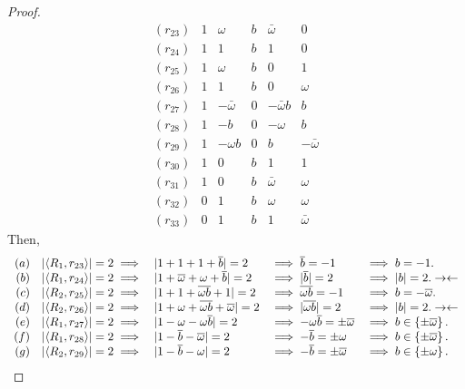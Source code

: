 \begin{lemma}
\begin{proof}
     $$
     \begin{array}{rccccc}
       (r_{23})  & 1 & \omega        & b         & \bar{\omega}   & 0 \\
       (r_{24})  & 1 & 1         & b         & 1         & 0 \\
       (r_{25})  & 1 & \omega        & b         & 0         & 1 \\
       (r_{26})  & 1 & 1         & b         & 0         & \omega  \\
       (r_{27})  & 1 & -\bar{\omega}  & 0         & -\bar{\omega}b & b \\
       (r_{28})  & 1 & -b        & 0         & -\omega        & b \\
       (r_{29})  & 1 & -\omega b       & 0         & b         & -\bar{\omega} \\
       (r_{30})  & 1 & 0         & b         & 1         & 1 \\
       (r_{31})  & 1 & 0         & b         & \bar{\omega}   & \omega  \\
       (r_{32})  & 0 & 1         & b         & \omega        & \omega  \\
       (r_{33})  & 0 & 1         & b         & 1         & \bar{\omega}
     \end{array}
     $$
Then,
     $$
     \begin{array}{rcllll}
      (a) & \unb1{23} \implies & |1+1+1+\bar{b}|=2             &\implies \bar{b}=-1             &\implies b = -1.          \\
      (b) & \unb1{24} \implies & |1+\bar{\omega}+\omega+\bar{b}|=2       &\implies |\bar{b}|=2            &\implies |b| = 2.   \con \\
      (c) & \unb2{25} \implies & |1+1+\overline{\omega b}+1|=2       &\implies \overline{\omega b} = -1     &\implies b = -\bar{\omega}.    \\
      (d) & \unb2{26} \implies & |1+\omega+\overline{\omega b}+\bar{\omega}|=2 &\implies |\overline{\omega b}|=2      &\implies |b| = 2.   \con \\
      (e) & \unb1{27} \implies & |1-\omega-\omega\bar{b}|=2              &\implies -\omega\bar{b} = \pm\bar{\omega} &\implies b \in \left\{ \pm\bar{\omega}\right\}.   \\
      (f) & \unb1{28} \implies & |1-\bar{b}-\bar{\omega}|=2         &\implies -\bar{b}=\pm\omega         &\implies b \in \left\{ \pm\bar{\omega}\right\}.  \\
      (g) & \unb2{29} \implies & |1-\bar{b}-\omega|=2               &\implies -\bar{b}=\pm\bar{\omega}    &\implies b \in \left\{ \pm\omega\right\}.       \\

\end{array}$$
\end{proof}
\end{lemma}
